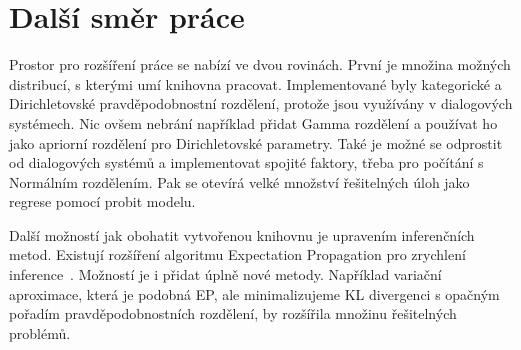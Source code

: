 \section*{Další směr práce}

Prostor pro rozšíření práce se nabízí ve dvou rovinách. 
První je množina možných distribucí, s kterými umí knihovna pracovat.
Implementované byly kategorické a Dirichletovské pravděpodobnostní rozdělení, protože jsou využívány v dialogových systémech.
Nic ovšem nebrání například přidat Gamma rozdělení a používat ho jako apriorní rozdělení pro Dirichletovské parametry.
Také je možné se odprostit od dialogových systémů a implementovat spojité faktory, třeba pro počítání s Normálním rozdělením.
Pak se otevírá velké množství řešitelných úloh jako regrese pomocí probit modelu.

Další možností jak obohatit vytvořenou knihovnu je upravením inferenčních metod.
Existují rozšíření algoritmu Expectation Propagation pro zrychlení inference~\cite{seeger2010fast}.
Možností je i přidat úplně nové metody.
Například variační aproximace, která je podobná EP, ale minimalizujeme KL divergenci s opačným pořadím pravděpodobnostních rozdělení, by rozšířila množinu řešitelných problémů.
